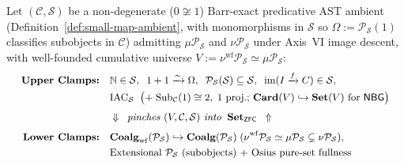 \begin{theorem}\label{thm:scale-invariance}%
%
Let $(\mathcal{C}, \mathcal{S})$ be a non-degenerate ($0 \not\cong 1$) Barr-exact predicative AST ambient (Definition~\ref{def:small-map-ambient}, with monomorphisms in $\mathcal{S}$ so $\Omega := \mathcal{P}_{\mathcal{S}}(1)$ classifies subobjects in $\mathcal{C}$) admitting $\mu \mathcal{P}_{\mathcal{S}}$ and $\nu \mathcal{P}_{\mathcal{S}}$ under Axis~VI image descent, with well-founded cumulative universe $V := \nu^{\mathrm{wf}} \mathcal{P}_{\mathcal{S}} \simeq \mu \mathcal{P}_{\mathcal{S}}$:
\[
  {\small\begin{aligned}
    \text{\textbf{Upper Clamps:}}\quad &\mathbb{N} \in \mathcal{S},\;\; 1+1 \xrightarrow{\sim} \Omega,\;\; \mathcal{P}_{\mathcal{S}}(\mathcal{S}) \subseteq \mathcal{S},\;\; \mathrm{im}(I \xrightarrow{f} C) \in \mathcal{S}, \\
    &\mathrm{IAC}_{\mathcal{S}}\;\; \bigl(\text{+\;}\mathrm{Sub}_{\mathcal{C}}(1)\cong 2,\; 1\text{ proj.; }\mathbf{Card}(V) \hookrightarrow \mathbf{Set}(V)\text{ for }\mathsf{NBG}\bigr) \\[0.25em]
    &\Downarrow \;\; \text{\emph{pinches $(V, \mathcal{C}, \mathcal{S})$ into}}\;\; \mathbf{Set}_{\mathsf{ZFC}} \;\;\Uparrow \\[0.25em]
    \text{\textbf{Lower Clamps:}}\quad &\mathbf{Coalg}_{\mathrm{wf}}(\mathcal{P}_{\mathcal{S}}) \hookrightarrow \mathbf{Coalg}(\mathcal{P}_{\mathcal{S}})\; (\nu^{\mathrm{wf}}\mathcal{P}_{\mathcal{S}} \simeq \mu\mathcal{P}_{\mathcal{S}} \subsetneq \nu\mathcal{P}_{\mathcal{S}}), \\
    &\text{Extensional }\mathcal{P}_{\mathcal{S}}\text{ (subobjects) + Osius pure-set fullness}
  \end{aligned}}
\]
\begin{enumerate}

\end{enumerate}
\end{theorem}

